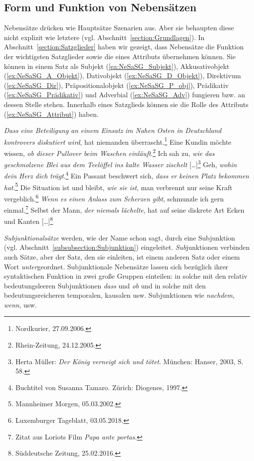 \subsection{Form und Funktion von Nebensätzen}\label{subsection:FormFktNeSa}

Nebensätze drücken wie Hauptsätze Szenarien aus. Aber sie behaupten diese nicht explizit wie letztere (vgl. Abschnitt~\ref{section:Grundlagen}). In Abschnitt~\ref{section:Satzglieder} haben wir gezeigt, dass Nebensätze die Funktion der wichtigsten Satzglieder sowie die eines Attributs übernehmen können. Sie können in einem Satz als Subjekt (\ref{ea:NeSaSG_Subjekt}), Akkusativobjekt (\ref{ex:NeSaSG_A_Objekt}), Dativobjekt (\ref{ex:NeSaSG_D_Objekt}), Direktivum (\ref{ex:NeSaSG_Dir}), Präpositionalobjekt (\ref{ex:NeSaSG_P_obj}), Prädikativ (\ref{ex:NeSaSG_Prädikativ}) und Adverbial (\ref{ex:NeSaSG_Adv}) fungieren bzw. an dessen Stelle stehen. Innerhalb eines Satzglieds können sie die Rolle des Attributs (\ref{ex:NeSaSG_Attribut}) haben.

\ea \label{ea:NeSaSGFunktion}
\ea \label{ea:NeSaSG_Subjekt} \textit{Dass eine Beteiligung an einem Einsatz im Nahen Osten in Deutschland kontrovers diskutiert wird}, hat niemanden überrascht.\footnote{Nordkurier, 27.09.2006.}
\ex \label{ex:NeSaSG_A_Objekt} Eine Kundin möchte wissen, \textit{ob dieser Pullover beim Waschen einläuft}.\footnote{Rhein-Zeitung, 24.12.2005.}
\ex \label{ex:NeSaSG_D_Objekt} Ich sah zu, \textit{wie das geschmolzene Blei aus dem Teelöffel ins kalte Wasser zischelt} [\ldots{}]\footnote{Herta Müller: \textit{Der König verneigt sich und tötet}. München: Hanser, 2003, S. 58.}
\ex \label{ex:NeSaSG_Dir} Geh, \textit{wohin dein Herz dich trägt}.\footnote{Buchtitel von Susanna Tamaro. Zürich: Diogenes, 1997.}
\ex \label{ex:NeSaSG_P_obj} Ein Passant beschwert sich, \textit{dass er keinen Platz bekommen hat}.\footnote{Mannheimer Morgen, 05.03.2002.}
\ex \label{ex:NeSaSG_Prädikativ} Die Situation ist und bleibt, \textit{wie sie ist}, man verbrennt nur seine Kraft vergeblich.\footnote{Luxemburger Tageblatt, 03.05.2018.}
\ex \label{ex:NeSaSG_Adv} \textit{Wenn es einen Anlass zum Scherzen gibt}, schmunzle ich gern einmal.\footnote{Zitat aus Loriots Film \textit{Papa ante portas}.}
\ex \label{ex:NeSaSG_Attribut} Selbst der Mann, \textit{der niemals lächelte}, hat auf seine diskrete Art Ecken und Kanten [\ldots{}]\footnote{Süddeutsche Zeitung, 25.02.2016.}
\z 
\z 

\textit{Subjunktionalsätze} werden, wie der Name schon sagt, durch eine Subjunktion (vgl. Abschnitt~\ref{subsubsection:Subjunktion}) eingeleitet. \textit{Sub}junktionen verbinden auch Sätze, aber der Satz, den sie einleiten, ist einem anderen Satz oder einem Wort \textit{unter}geordnet. Subjunktionale Nebensätze lassen sich bezüglich ihrer syntaktischen Funktion in zwei große Gruppen einteilen: in solche mit den relativ bedeutungsleeren Subjunktionen \textit{dass} und \textit{ob} und in solche mit den bedeutungsreicheren temporalen, kausalen usw. Subjunktionen wie \textit{nachdem}, \textit{wenn}, usw. 

